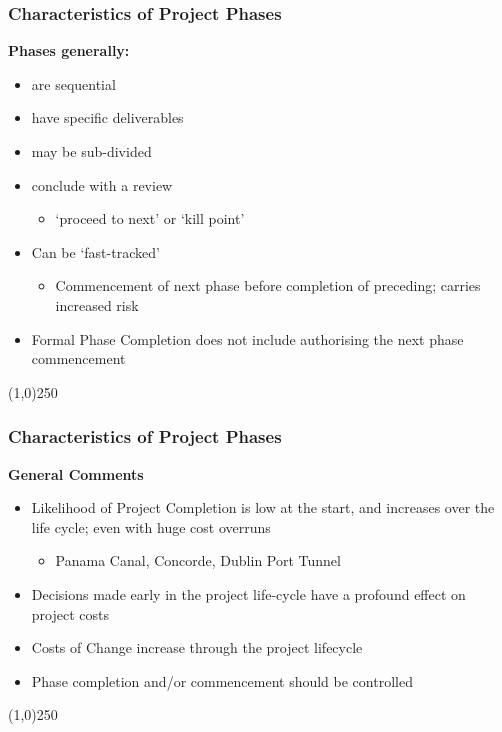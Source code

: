 \begin{frame}
\frametitle{Characteristics of Project Phases}
\textbf{Phases generally:}
\begin{itemize}
	\item are sequential
	\item have specific deliverables
	\item may be sub-divided
	\item conclude with a review
		\begin{itemize}
			\item `proceed to next' or `kill point'
		\end{itemize}
	\item Can be `fast-tracked'
		\begin{itemize}
			\item Commencement of next phase before completion of preceding; carries increased risk
		\end{itemize}
	\item Formal Phase Completion does not include authorising the next phase commencement
\end{itemize}
\end{frame}
\begin{center}\line(1,0){250}\end{center}



\begin{frame}
\frametitle{Characteristics of Project Phases}
\textbf{General Comments}\\
\begin{itemize}
	\item Likelihood of Project Completion is low at the start, and increases over the life cycle; even with huge cost overruns	
		\begin{itemize}
			\item Panama Canal, Concorde, Dublin Port Tunnel
		\end{itemize}
	\item Decisions made early in the project life-cycle have a profound effect on project costs
	\item Costs of Change increase through the project lifecycle
	\item Phase completion and/or commencement should be controlled
\end{itemize}
\end{frame}
\begin{center}\line(1,0){250}\end{center}



